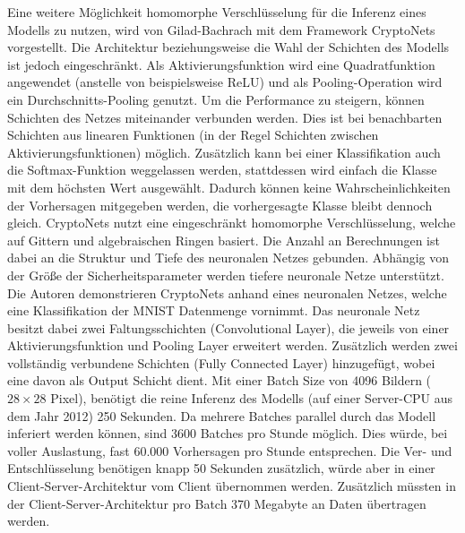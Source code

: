Eine weitere Möglichkeit homomorphe Verschlüsselung für die Inferenz eines Modells zu nutzen, wird von Gilad-Bachrach \etal mit dem Framework CryptoNets \cite{P-54} vorgestellt.
Die Architektur beziehungsweise die Wahl der Schichten des Modells ist jedoch eingeschränkt. 
Als Aktivierungsfunktion wird eine Quadratfunktion angewendet (anstelle von beispielsweise ReLU) und als Pooling-Operation wird ein Durchschnitts-Pooling genutzt.
Um die Performance zu steigern, können Schichten des Netzes miteinander verbunden werden. 
Dies ist bei benachbarten Schichten aus linearen Funktionen (in der Regel Schichten zwischen Aktivierungsfunktionen) möglich.
Zusätzlich kann bei einer Klassifikation auch die Softmax-Funktion weggelassen werden, stattdessen wird einfach die Klasse mit dem höchsten Wert ausgewählt. 
Dadurch können keine Wahrscheinlichkeiten der Vorhersagen mitgegeben werden, die vorhergesagte Klasse bleibt dennoch gleich.
CryptoNets nutzt eine eingeschränkt homomorphe Verschlüsselung, welche auf Gittern und algebraischen Ringen basiert. 
Die Anzahl an Berechnungen ist dabei an die Struktur und Tiefe des neuronalen Netzes gebunden.
Abhängig von der Größe der Sicherheitsparameter werden tiefere neuronale Netze unterstützt.
Die Autoren demonstrieren CryptoNets anhand eines neuronalen Netzes, welche eine Klassifikation der MNIST Datenmenge \cite{D-MNIST} vornimmt.
Das neuronale Netz besitzt dabei zwei Faltungsschichten (Convolutional Layer), die jeweils von einer Aktivierungsfunktion und Pooling Layer erweitert werden.
Zusätzlich werden zwei vollständig verbundene Schichten (Fully Connected Layer) hinzugefügt, wobei eine davon als Output Schicht dient.
Mit einer Batch Size von 4096 Bildern ($28 \times 28$ Pixel), benötigt die reine Inferenz des Modells (auf einer Server-CPU aus dem Jahr 2012) 250 Sekunden.
Da mehrere Batches parallel durch das Modell inferiert werden können, sind 3600 Batches pro Stunde möglich. 
Dies würde, bei voller Auslastung, fast 60.000 Vorhersagen pro Stunde entsprechen.
Die Ver- und Entschlüsselung benötigen knapp 50 Sekunden zusätzlich, würde aber in einer Client-Server-Architektur vom Client übernommen werden.
Zusätzlich müssten in der Client-Server-Architektur pro Batch 370 Megabyte an Daten übertragen werden.

